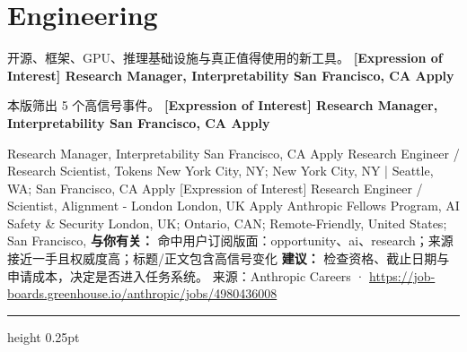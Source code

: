 \documentclass[10.5pt]{ctexart}
\begin{document}
\section*{Engineering}
{\color{ormuted} 开源、框架、GPU、推理基础设施与真正值得使用的新工具。}
\vspace{2mm}
{\LARGE\bfseries [Expression of Interest] Research Manager, Interpretability San Francisco, CA Apply}\par
\vspace{1mm}
{\color{ormuted} 本版筛出 5 个高信号事件。}
\vspace{3mm}
{\Large\bfseries [Expression of Interest] Research Manager, Interpretability San Francisco, CA Apply}\par
[Expression of Interest] Research Manager, Interpretability San Francisco, CA Apply Research Engineer / Research Scientist, Tokens New York City, NY; New York City, NY | Seattle, WA; San Francisco, CA Apply [Expression of Interest] Research Engineer / Scientist, Alignment - London London, UK Apply Anthropic Fellows Program, AI Safety \& Security London, UK; Ontario, CAN; Remote-Friendly, United States; San Francisco, 
\textbf{与你有关：} 命中用户订阅版面：opportunity、ai、research；来源接近一手且权威度高；标题/正文包含高信号变化
\textbf{建议：} 检查资格、截止日期与申请成本，决定是否进入任务系统。
{\footnotesize\color{ormuted} 来源：Anthropic Careers · \url{https://job-boards.greenhouse.io/anthropic/jobs/4980436008}}
\vspace{4mm}
\hrule height 0.25pt
\vspace{3mm}
\end{document}
